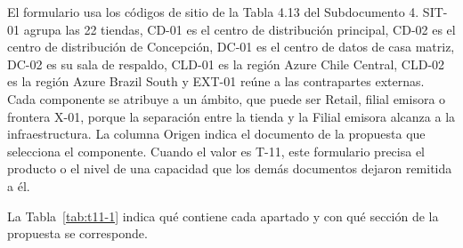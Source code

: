 \documentclass[11pt]{article}
\begin{document}
El formulario usa los códigos de sitio de la Tabla 4.13 del Subdocumento 4. SIT-01 agrupa las 22 tiendas, CD-01 es el centro de distribución principal, CD-02 es el centro de distribución de Concepción, DC-01 es el centro de datos de casa matriz, DC-02 es su sala de respaldo, CLD-01 es la región Azure Chile Central, CLD-02 es la región Azure Brazil South y EXT-01 reúne a las contrapartes externas. Cada componente se atribuye a un ámbito, que puede ser Retail, filial emisora o frontera X-01, porque la separación entre la tienda y la Filial emisora alcanza a la infraestructura. La columna Origen indica el documento de la propuesta que selecciona el componente. Cuando el valor es T-11, este formulario precisa el producto o el nivel de una capacidad que los demás documentos dejaron remitida a él.

La Tabla~\mbox{\ref{tab:t11-1}} indica qué contiene cada apartado y con qué sección de la propuesta se corresponde.
\end{document}
